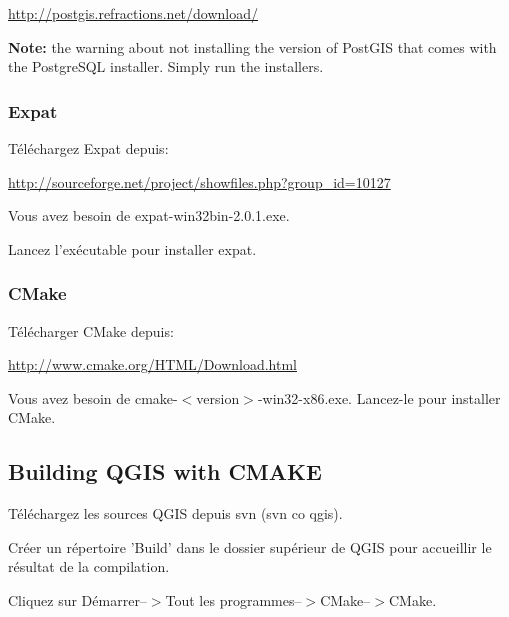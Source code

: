 \url{http://postgis.refractions.net/download/}

\textbf{Note:} the warning about not installing the version of PostGIS that
comes with the PostgreSQL installer. Simply run the installers.

\subsubsection{Expat}
T\'el\'echargez Expat depuis:

\url{http://sourceforge.net/project/showfiles.php?group\_id=10127}

Vous avez besoin de expat-win32bin-2.0.1.exe.

Lancez l'ex\'ecutable pour installer expat.

\subsubsection{CMake}
T\'el\'echarger CMake depuis:

\url{http://www.cmake.org/HTML/Download.html}

Vous avez besoin de cmake-$<$version$>$-win32-x86.exe. Lancez-le pour installer CMake.

\subsection{Building QGIS with CMAKE}
T\'el\'echargez les sources QGIS depuis svn (svn co  qgis).

Cr\'eer un r\'epertoire 'Build' dans le dossier sup\'erieur de QGIS pour accueillir le r\'esultat de la compilation.

Cliquez sur D\'emarrer--$>$Tout les programmes--$>$CMake--$>$CMake. 

% 
% 
% 
% 

